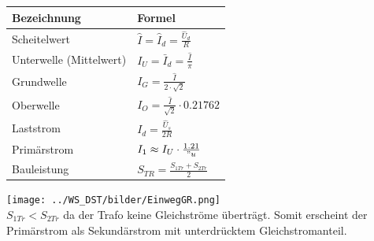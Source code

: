 	\begin{minipage}[c]{10cm}  
		\begin{tabular}{| l | l |}
    		\hline 
      		\textbf{Bezeichnung}
      		& \textbf{Formel} \\
      		\hline
      		Scheitelwert 
      		& $\hat{I} = \hat{I}_d = \frac{\hat{U}_d}{R} $ \\
      		Unterwelle (Mittelwert)
      		& $I_U = \bar{I}_d = \frac{\hat{I}}{\pi}$ \\
      		Grundwelle
      		& $I_G = \frac{\hat{I}}{2 \cdot \sqrt{2}}$ \\
      		Oberwelle
      		& $I_O = \frac{\hat{I}}{\sqrt{2}} \cdot 0.21762$ \\
      		Laststrom
      		& $I_{d} =\frac{\hat{U}_s}{2 R}$ \\
      		Primärstrom
      		& $I_1 \approx I_U \cdot \frac{1.21}{"u}$ \\
      		Bauleistung 
      		& $S_{TR} = \frac{S_{1Tr} + S_{2Tr}}{2}$ \\
      		\hline 
    	\end{tabular}
	\end{minipage}   
	\begin{minipage}[c]{8cm}  
			\texttt{[image: ../WS\_DST/bilder/EinwegGR.png]}  \\			
	$S_{1Tr} < S_{2Tr}$ da der Trafo keine Gleichströme überträgt. Somit erscheint der Primärstrom
	als Sekundärstrom mit unterdrücktem Gleichstromanteil.			
	\end{minipage}

\newpage

